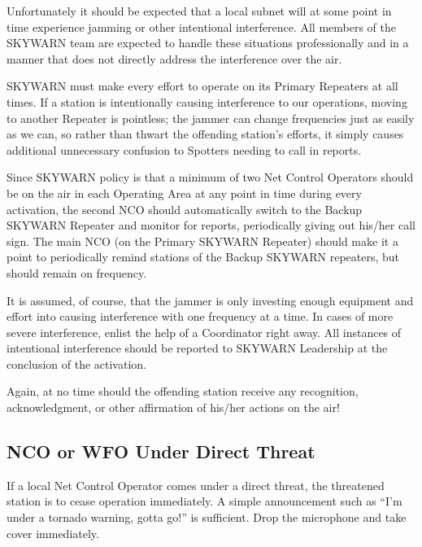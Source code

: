 \documentclass[pdflatex,letterpaper,twoside,12pt]{book}
\begin{document}
Unfortunately it should be expected that a local subnet will at some point in time experience jamming or other intentional interference.  All members of the SKYWARN team are expected to handle these situations professionally and in a manner that does not directly address the interference over the air. 

SKYWARN must make every effort to operate on its Primary Repeaters at all times.  If a station is intentionally causing interference to our operations, moving to another Repeater is pointless; the jammer can change frequencies just as easily as we can, so rather than thwart the offending station's efforts, it simply causes additional unnecessary confusion to Spotters needing to call in reports. 

Since SKYWARN policy is that a minimum of two Net Control Operators should be on the air in each Operating Area at any point in time during every activation, the second NCO should automatically switch to the Backup SKYWARN Repeater and monitor for reports, periodically giving out his/her call sign.  The main NCO (on the Primary SKYWARN Repeater) should make it a point to periodically remind stations of the Backup SKYWARN repeaters, but should remain on frequency. 

It is assumed, of course, that the jammer is only investing enough equipment and effort into causing interference with one frequency at a time.  In cases of more severe interference, enlist the help of a Coordinator right away.  All instances of intentional interference should be reported to SKYWARN Leadership at the conclusion of the activation. 

Again, at no time should the offending station receive any recognition, acknowledgment, or other affirmation of his/her actions on the air!

\subsection{NCO or WFO Under Direct Threat}

If a local Net Control Operator comes under a direct threat, the threatened station is to cease operation immediately.  A simple announcement such as ``I'm under a tornado warning, gotta go!'' is sufficient. Drop the microphone and take cover immediately.

\bigskip
\end{document}

